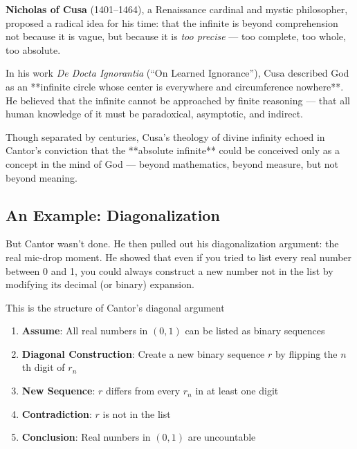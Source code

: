 \begin{tcolorbox}[colback=gray!5!white, colframe=black!80!white, title={Historical Sidenote: Nicholas of Cusa and the Paradox of the Infinite}]

  \textbf{Nicholas of Cusa} (1401–1464), a Renaissance cardinal and mystic philosopher, proposed a radical idea for his time: that the infinite is beyond comprehension not because it is vague, but because it is \textit{too precise} — too complete, too whole, too absolute.
  
  In his work \textit{De Docta Ignorantia} (“On Learned Ignorance”), Cusa described God as an **infinite circle whose center is everywhere and circumference nowhere**. He believed that the infinite cannot be approached by finite reasoning — that all human knowledge of it must be paradoxical, asymptotic, and indirect.
  
  \medskip
  
  Though separated by centuries, Cusa’s theology of divine infinity echoed in Cantor’s conviction that the **absolute infinite** could be conceived only as a concept in the mind of God — beyond mathematics, beyond measure, but not beyond meaning.
  
\end{tcolorbox}
  












\subsection{An Example: Diagonalization}

But Cantor wasn’t done. He then pulled out his diagonalization argument: the real mic-drop moment. He showed that even if you tried to list every real number between 0 and 1, you could always construct a new number not in the list by modifying its decimal (or binary) expansion.

This is the structure of Cantor’s diagonal argument
\begin{enumerate}
	\item \textbf{Assume}: All real numbers in $(0,1)$ can be listed as binary sequences
	\item \textbf{Diagonal Construction}: Create a new binary sequence $r$ by flipping the $n$th digit of $r_n$
	\item \textbf{New Sequence}:  $r$ differs from every $r_n$ in at least one digit
	\item \textbf{Contradiction}: $r$ is not in the list
	\item \textbf{Conclusion}: Real numbers in $(0,1)$ are uncountable
\end{enumerate}





